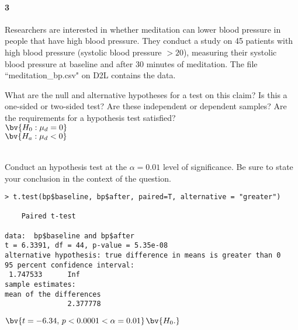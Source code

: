 \documentclass{article}
\begin{document}
\begin{flushleft}
\newpage
\paragraph{3} Researchers are interested in whether meditation can lower blood pressure in people that have high blood pressure. They conduct a study on 45 patients with high blood pressure (systolic blood pressure $> 20$), measuring their systolic blood pressure at baseline and after 30 minutes of meditation. The file ``meditation\_bp.csv" on D2L contains the data.
\begin{enumalpha}
\item What are the null and alternative hypotheses for a test on this claim? Is this a one-sided or two-sided test? Are these independent or dependent samples? Are the requirements for a hypothesis test satisfied?\\

$\bv{H_0: \mu_d = 0}$ \\
$\bv{H_a: \mu_d < 0}$ \\
\\
\vspace{.5in}

\item Conduct an hypothesis test at the $\alpha = 0.01$ level of significance. Be sure to state your conclusion in the context of the question.\\
\medskip
\begin{verbatim}
> t.test(bp$baseline, bp$after, paired=T, alternative = "greater")

	Paired t-test

data:  bp$baseline and bp$after
t = 6.3391, df = 44, p-value = 5.35e-08
alternative hypothesis: true difference in means is greater than 0
95 percent confidence interval:
 1.747533      Inf
sample estimates:
mean of the differences 
               2.377778 
\end{verbatim}

$\bv{t = -6.34, \, p < 0.0001 < \alpha =0.01}$$\bv{H_0.}$\\
\vspace{.5in}
\end{enumalpha}



\end{flushleft}
\end{document}
